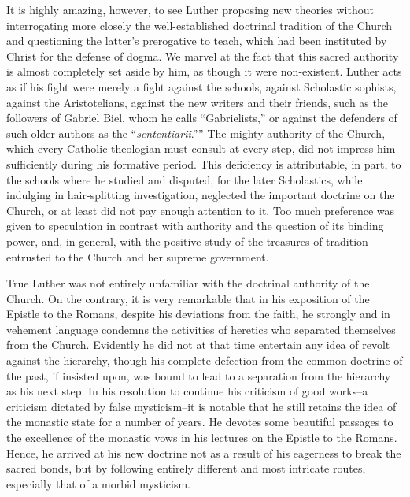 It is highly amazing, however, to see Luther proposing new theories
without interrogating more closely the well-established doctrinal
tradition of the Church and questioning the latter’s prerogative to
teach, which had been instituted by Christ for the defense of dogma.
We marvel at the fact that this sacred authority is almost completely
set aside by him, as though it were non-existent. Luther acts
as if his fight were merely a fight against the schools, against Scholastic
sophists, against the Aristotelians, against the new writers and
their friends, such as the followers of Gabriel Biel, whom he calls
“Gabrielists,” or against the defenders of such older authors as the
“\textit{sententiarii}.”” The mighty authority of the Church, which every
Catholic theologian must consult at every step, did not impress
him sufficiently during his formative period. This deficiency is attributable,
in part, to the schools where he studied and disputed,
for the later Scholastics, while indulging in hair-splitting investigation,
neglected the important doctrine on the Church, or at least did
not pay enough attention to it. Too much preference was given to
speculation in contrast with authority and the question of its binding
power, and, in general, with the positive study of the treasures
of tradition entrusted to the Church and her supreme government.

True Luther was not entirely unfamiliar with the doctrinal authority of
the Church. On the contrary, it is very remarkable that
in his exposition of the Epistle to the Romans, despite his deviations
from the faith, he strongly and in vehement language condemns
the activities of heretics who separated themselves from the
Church. Evidently he did not at that time entertain any idea of
revolt against the hierarchy, though his complete defection from
the common doctrine of the past, if insisted upon, was bound to lead
to a separation from the hierarchy as his next step.
In his resolution to continue his criticism of good works--a
criticism dictated by false mysticism--it is notable that he still retains
the idea of the monastic state for a number of years. He devotes some beautiful
passages to the excellence of the monastic vows
in his lectures on the Epistle to the Romans. Hence, he arrived at his
new doctrine not as a result of his eagerness to break the sacred bonds,
but by following entirely different and most intricate routes, especially
that of a morbid mysticism.
